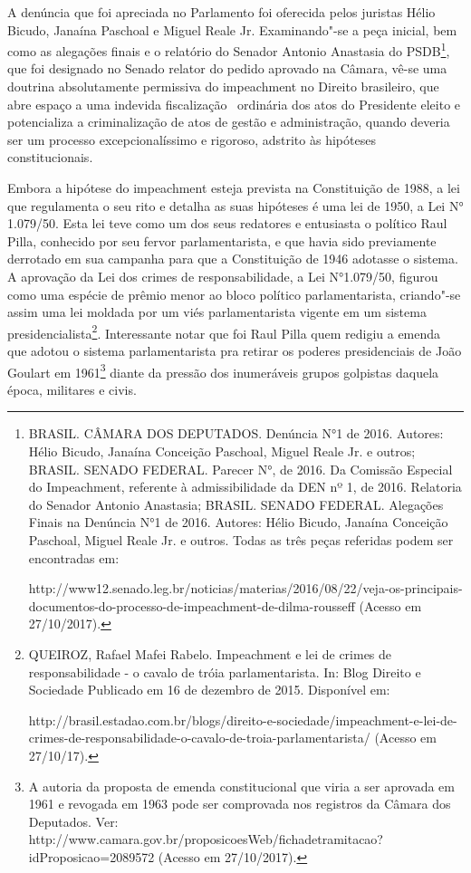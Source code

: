 A denúncia que foi apreciada no Parlamento foi oferecida pelos juristas
Hélio Bicudo, Janaína Paschoal e Miguel Reale Jr. Examinando"-se a peça
inicial, bem como as alegações finais e o relatório do Senador Antonio
Anastasia do PSDB\footnote{BRASIL. CÂMARA DOS DEPUTADOS. Denúncia N°1 de
  2016. Autores: Hélio Bicudo, Janaína Conceição Paschoal, Miguel Reale
  Jr. e outros; BRASIL. SENADO FEDERAL. Parecer N°, de 2016. Da Comissão
  Especial do Impeachment, referente à admissibilidade da DEN nº 1, de
  2016. Relatoria do Senador Antonio Anastasia; BRASIL. SENADO FEDERAL.
  Alegações Finais na Denúncia N°1 de 2016. Autores: Hélio Bicudo,
  Janaína Conceição Paschoal, Miguel Reale Jr. e outros. Todas as três
  peças referidas podem ser encontradas em:

  http://www12.senado.leg.br/noticias/materias/2016/08/22/veja-os-principais-documentos-do-processo-de-impeachment-de-dilma-rousseff
  (Acesso em 27/10/2017).}, que foi designado no Senado relator do
pedido aprovado na Câmara, vê-se uma doutrina absolutamente permissiva
do impeachment no Direito brasileiro, que abre espaço a uma indevida
fiscalização~ ordinária dos atos do Presidente eleito e potencializa a
criminalização de atos de gestão e administração, quando deveria ser um
processo excepcionalíssimo e rigoroso, adstrito às hipóteses
constitucionais.

Embora a hipótese do impeachment esteja prevista na Constituição de
1988, a lei que regulamenta o seu rito e detalha as suas hipóteses é uma
lei de 1950, a Lei N° 1.079/50. Esta lei teve como um dos seus redatores
e entusiasta o político Raul Pilla, conhecido por seu fervor
parlamentarista, e que havia sido previamente derrotado em sua campanha
para que a Constituição de 1946 adotasse o sistema. A aprovação da Lei
dos crimes de responsabilidade, a Lei N°1.079/50, figurou como uma
espécie de prêmio menor ao bloco político parlamentarista, criando"-se
assim uma lei moldada por um viés parlamentarista vigente em um sistema
presidencialista\footnote{QUEIROZ, Rafael Mafei Rabelo. Impeachment e
  lei de crimes de responsabilidade - o cavalo de tróia parlamentarista.
  In: Blog Direito e Sociedade Publicado em 16 de dezembro de 2015.
  Disponível em:

  http://brasil.estadao.com.br/blogs/direito-e-sociedade/impeachment-e-lei-de-crimes-de-responsabilidade-o-cavalo-de-troia-parlamentarista/
  (Acesso em 27/10/17).}. Interessante notar que foi Raul Pilla quem
redigiu a emenda que adotou o sistema parlamentarista pra retirar os
poderes presidenciais de João Goulart em 1961\footnote{A autoria da
  proposta de emenda constitucional que viria a ser aprovada em 1961 e
  revogada em 1963 pode ser comprovada nos registros da Câmara dos
  Deputados. Ver:
  http://www.camara.gov.br/proposicoesWeb/fichadetramitacao?idProposicao=2089572
  (Acesso em 27/10/2017).} diante da pressão dos inumeráveis grupos
golpistas daquela época, militares e civis.


